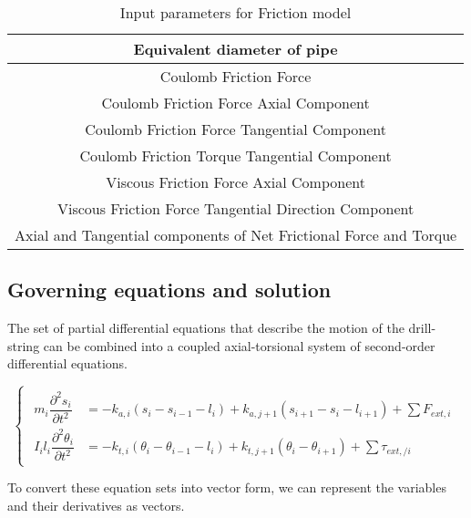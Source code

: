 \begin{table}
  \centering
  \begin{tabular}{|c|}
    \hline
    Equivalent diameter of pipe\\
    \hline
    Coulomb Friction Force \\
    \hline
    Coulomb Friction Force Axial Component \\
    \hline
    Coulomb Friction Force Tangential Component \\
    \hline
    Coulomb Friction Torque Tangential Component \\
    \hline
    Viscous Friction Force Axial Component \\
    \hline
    Viscous Friction Force Tangential Direction Component \\
    \hline
    Axial and Tangential components of Net Frictional Force and Torque \\
    \hline
  \end{tabular}
  \caption{Input parameters for Friction model}\label{Table_Friction_Input}
\end{table}

\subsection{Governing equations and solution}

The set of partial differential equations that describe the motion of the drill-string can be combined into a coupled axial-torsional system of second-order differential equations. 

\begin{equation}\label{Governing equations}
  \begin{cases}
   \begin{aligned}
     m_{i}\dfrac{\partial^{2}s_{i}}{\partial t^{2}} & = -k_{a,i}(s_{i}-s_{i-1}-l_{i}) + k_{a,j+1}(s_{i+1}-s_{i}-l_{i+1}) + \sum{F_{ext, i}} \\
     I_{i}l_{i}\dfrac{\partial^{2}\theta_{i}}{\partial t^{2}} & = -k_{t,i}(\theta_{i}-\theta_{i-1}-l_{i}) + k_{t,j+1}(\theta_{i}-\theta_{i+1}) + \sum{\tau_{ext,/ i}}
   \end{aligned}
  \end{cases}
\end{equation}

To convert these equation sets into vector form, we can represent the variables and their derivatives as vectors.

